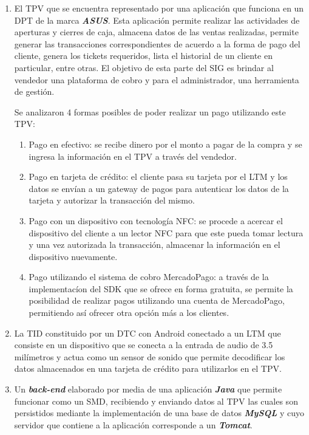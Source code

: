 \begin{enumerate}
\item El \ac{TPV} que se encuentra representado por una aplicaci\'on que funciona en un \ac{DPT} de la marca \textbf{\textit{ASUS}}. Esta aplicaci\'on permite realizar las actividades de aperturas y cierres de caja, almacena datos de las ventas realizadas, permite generar las transacciones correspondientes de acuerdo a la forma de pago del cliente, genera los tickets requeridos, lista el historial de un cliente en particular, entre otras. El objetivo de esta parte del \ac{SIG} es brindar al vendedor una plataforma de cobro y para el administrador, una herramienta de gesti\'on.

Se analizaron 4 formas posibles de poder realizar un pago utilizando este \ac{TPV}:

\begin{enumerate}
\item Pago en efectivo: se recibe dinero por el monto a pagar de la compra y se ingresa la informaci\'on en el \ac{TPV} a trav\'es del vendedor.
\item Pago en tarjeta de cr\'edito: el cliente pasa su tarjeta por el \ac{LTM} y los datos se env\'ian a un gateway de pagos para autenticar los datos de la tarjeta y autorizar la transacci\'on del mismo.
\item Pago con un dispositivo con tecnolog\'ia \ac{NFC}: se procede a acercar el dispositivo del cliente a un lector \ac{NFC} para que este pueda tomar lectura y una vez autorizada la transacci\'on, almacenar la informaci\'on en el dispositivo nuevamente.
\item Pago utilizando el sistema de cobro MercadoPago\Si{\texttrademark}: a trav\'es de la implementac\'ion del \ac{SDK} que se ofrece en forma gratuita, se permite la posibilidad de realizar pagos utilizando una cuenta de MercadoPago\Si{\texttrademark}, permitiendo as\'i ofrecer otra opci\'on m\'as a los clientes.
\end{enumerate}

\item La \ac{TID} constituido por un \ac{DTC} con Android\Si{\texttrademark} conectado a un \ac{LTM} que consiste en un dispositivo que se conecta a la entrada de audio de 3.5 mil\'imetros y actua como un sensor de sonido que permite decodificar los datos almacenados en una tarjeta de cr\'edito para utilizarlos en el \ac{TPV}. 

\item Un \textbf{\textit{back-end}} elaborado por media de una aplicaci\'on \textbf{\textit{Java}} que permite funcionar como un \ac{SMD}, recibiendo y enviando datos al \ac{TPV} las cuales son persistidos mediante la implementaci\'on de una base de datos \textbf{\textit{MySQL}} y cuyo servidor que contiene a la aplicaci\'on corresponde a un \textbf{\textit{Tomcat}}.
\end{enumerate}

